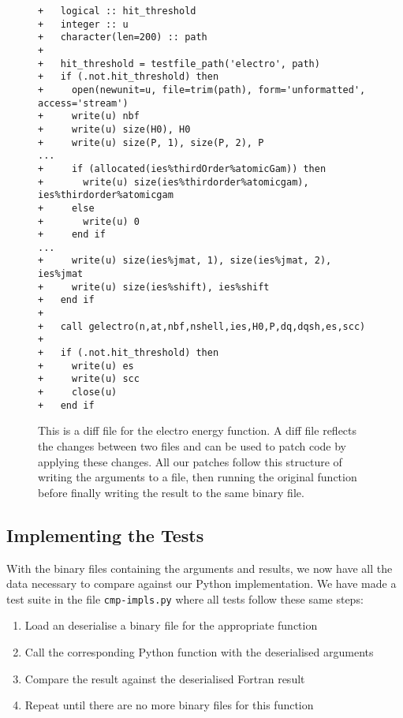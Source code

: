 \begin{figure}[H]
\begin{verbatim}
+   logical :: hit_threshold
+   integer :: u
+   character(len=200) :: path
+
+   hit_threshold = testfile_path('electro', path)
+   if (.not.hit_threshold) then
+     open(newunit=u, file=trim(path), form='unformatted', access='stream')
+     write(u) nbf
+     write(u) size(H0), H0
+     write(u) size(P, 1), size(P, 2), P
...
+     if (allocated(ies%thirdOrder%atomicGam)) then
+       write(u) size(ies%thirdorder%atomicgam), ies%thirdorder%atomicgam
+     else
+       write(u) 0
+     end if
...
+     write(u) size(ies%jmat, 1), size(ies%jmat, 2), ies%jmat
+     write(u) size(ies%shift), ies%shift
+   end if
+
+   call gelectro(n,at,nbf,nshell,ies,H0,P,dq,dqsh,es,scc)
+
+   if (.not.hit_threshold) then
+     write(u) es
+     write(u) scc
+     close(u)
+   end if
\end{verbatim}
\caption{This is a diff file for the electro energy function. A diff file reflects the changes between two files and can be used to patch code by applying these changes. All our patches follow this structure of writing the arguments to a file, then running the original function before finally writing the result to the same binary file.}
\label{fig:patchfile}
\end{figure}

\subsection{Implementing the Tests}

With the binary files containing the arguments and results, we now have all the data necessary to compare against our Python implementation. We have made a test suite in the file \verb|cmp-impls.py| where all tests follow these same steps:

\begin{enumerate}
   \item Load an deserialise a binary file for the appropriate function
   \item Call the corresponding Python function with the deserialised arguments
   \item Compare the result against the deserialised Fortran result
   \item Repeat until there are no more binary files for this function
\end{enumerate}


